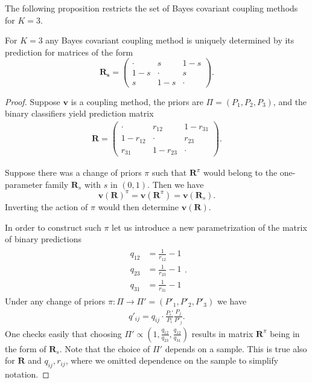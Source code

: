 The following proposition restricts the set of Bayes covariant coupling methods for $K=3$.

\begin{prop} \label{prop:bc3}
	For $K=3$ any Bayes covariant coupling method is uniquely determined by its prediction for  matrices of the form
	$$
	\boldsymbol{R_s} = \begin{pmatrix} \cdot & s & 1 -s \\  1-s & \cdot & s \\ s & 1-s & \cdot \end{pmatrix}.
	$$
\end{prop}
\begin{proof}
	Suppose $\boldsymbol{v}$ is a coupling method,  the priors are $\Pi = (P_1, P_2,P_3)$, and the binary classifiers yield prediction matrix 
	\begin{align}
		\boldsymbol{R} = \begin{pmatrix} \cdot & r_{12} & 1 - r_{31} \\ 1-r_{12} & \cdot & r_{23} \\
			r_{31} & 1- r_{23} & \cdot \end{pmatrix}.
	\end{align}
	
	Suppose there was a change of priors $\pi$ such that $\boldsymbol{R}^\pi$ would belong to the one-parameter family $\boldsymbol{R}_s$ with $s$ in $(0,1)$. Then we have
	$$
	\boldsymbol{v}(\boldsymbol{R})^\pi = \boldsymbol{v}(\boldsymbol{R}^\pi) = \boldsymbol{v}(\boldsymbol{R}_s).
	$$
	Inverting the action of $\pi$ would then determine $\boldsymbol{v}(\boldsymbol{R})$.
	
	In order to construct such $\pi$ let us introduce a new parametrization of the matrix of binary  predictions
	\begin{align}
		\begin{split}
			q_{12} &= \frac{1}{r_{12}} -1 \\
			q_{23} &= \frac{1}{r_{23}} -1 \\
			q_{31} &= \frac{1}{r_{31}} -1 
		\end{split}.
	\end{align}
	Under any change of priors $\pi:\Pi \rightarrow \Pi' = (P'_1, P'_2, P'_3)$ we have
	\begin{align}
		q'_{ij}	= q_{ij} \cdot \frac{P_i'}{P_i} \frac{P_j}{P'_j}.
	\end{align}
	One checks easily that choosing $\Pi' \propto (1, \frac{q_{12}}{q_{23}}, \frac{q_{12}}{q_{31}})$ results in matrix $\boldsymbol{R}^\pi$ being in the form of $\boldsymbol{R}_s$. Note that the choice of $\Pi'$ depends on a sample. This is true also for 
$\boldsymbol{R}$ and $q_{ij}, r_{ij}$, where we omitted dependence on the sample to simplify notation.
	
\end{proof}



